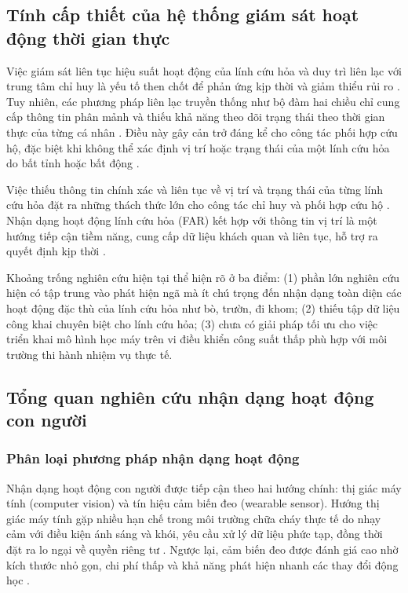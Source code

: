 \subsection{Tính cấp thiết của hệ thống giám sát hoạt động thời gian thực}

Việc giám sát liên tục hiệu suất hoạt động của lính cứu hỏa và duy trì liên lạc với trung tâm chỉ huy là yếu tố then chốt để phản ứng kịp thời và giảm thiểu rủi ro \cite{FirefighterImportant2022}. Tuy nhiên, các phương pháp liên lạc truyền thống như bộ đàm hai chiều chỉ cung cấp thông tin phân mảnh và thiếu khả năng theo dõi trạng thái theo thời gian thực của từng cá nhân \cite{Clifford2021}. Điều này gây cản trở đáng kể cho công tác phối hợp cứu hộ, đặc biệt khi không thể xác định vị trí hoặc trạng thái của một lính cứu hỏa do bất tỉnh hoặc bất động \cite{Zhang2024}.

Việc thiếu thông tin chính xác và liên tục về vị trí và trạng thái của từng lính cứu hỏa đặt ra những thách thức lớn cho công tác chỉ huy và phối hợp cứu hộ \cite{Firefighter_Falling_2023, Firefighterhealthcare2024}. Nhận dạng hoạt động lính cứu hỏa (FAR) kết hợp với thông tin vị trí là một hướng tiếp cận tiềm năng, cung cấp dữ liệu khách quan và liên tục, hỗ trợ ra quyết định kịp thời \cite{Accelerometerlocation2021}.

Khoảng trống nghiên cứu hiện tại thể hiện rõ ở ba điểm: (1) phần lớn nghiên cứu hiện có tập trung vào phát hiện ngã mà ít chú trọng đến nhận dạng toàn diện các hoạt động đặc thù của lính cứu hỏa như bò, trườn, đi khom; (2) thiếu tập dữ liệu công khai chuyên biệt cho lính cứu hỏa; (3) chưa có giải pháp tối ưu cho việc triển khai mô hình học máy trên vi điều khiển công suất thấp phù hợp với môi trường thi hành nhiệm vụ thực tế.

\subsection{Tổng quan nghiên cứu nhận dạng hoạt động con người}

\subsubsection{Phân loại phương pháp nhận dạng hoạt động}

Nhận dạng hoạt động con người được tiếp cận theo hai hướng chính: thị giác máy tính (computer vision) và tín hiệu cảm biến đeo (wearable sensor). Hướng thị giác máy tính gặp nhiều hạn chế trong môi trường chữa cháy thực tế do nhạy cảm với điều kiện ánh sáng và khói, yêu cầu xử lý dữ liệu phức tạp, đồng thời đặt ra lo ngại về quyền riêng tư \cite{HARvision2020}. Ngược lại, cảm biến đeo được đánh giá cao nhờ kích thước nhỏ gọn, chi phí thấp và khả năng phát hiện nhanh các thay đổi động học \cite{Accelerometer2021, DaoHieu2022, ViManhTuyen2024, HongNhung2023}.

